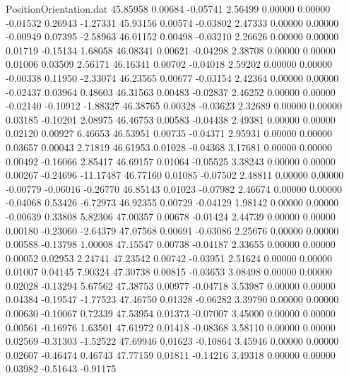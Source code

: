 \begin{filecontents}{PositionOrientation.dat}
  45.85958    0.00684   -0.05741     2.56499    0.00000    0.00000   -0.01532    0.26943   -1.27331
  45.93156    0.00574   -0.03802     2.47333    0.00000    0.00000   -0.00949    0.07395   -2.58963
  46.01152    0.00498   -0.03210     2.26626    0.00000    0.00000    0.01719   -0.15134    1.68058
  46.08341    0.00621   -0.04298     2.38708    0.00000    0.00000    0.01006    0.03509    2.56171
  46.16341    0.00702   -0.04018     2.59202    0.00000    0.00000   -0.00338    0.11950   -2.33074
  46.23565    0.00677   -0.03154     2.42364    0.00000    0.00000   -0.02437    0.03964    0.48603
  46.31563    0.00483   -0.02837     2.46252    0.00000    0.00000   -0.02140   -0.10912   -1.88327
  46.38765    0.00328   -0.03623     2.32689    0.00000    0.00000    0.03185   -0.10201    2.08975
  46.46753    0.00583   -0.04438     2.49381    0.00000    0.00000    0.02120    0.00927    6.46653
  46.53951    0.00735   -0.04371     2.95931    0.00000    0.00000    0.03657    0.00043    2.71819
  46.61953    0.01028   -0.04368     3.17681    0.00000    0.00000    0.00492   -0.16066    2.85417
  46.69157    0.01064   -0.05525     3.38243    0.00000    0.00000    0.00267   -0.24696  -11.17487
  46.77160    0.01085   -0.07502     2.48811    0.00000    0.00000   -0.00779   -0.06016   -0.26770
  46.85143    0.01023   -0.07982     2.46674    0.00000    0.00000   -0.04068    0.53426   -6.72973
  46.92355    0.00729   -0.04129     1.98142    0.00000    0.00000   -0.00639    0.33808    5.82306
  47.00357    0.00678   -0.01424     2.44739    0.00000    0.00000    0.00180   -0.23060   -2.64379
  47.07568    0.00691   -0.03086     2.25676    0.00000    0.00000    0.00588   -0.13798    1.00008
  47.15547    0.00738   -0.04187     2.33655    0.00000    0.00000    0.00052    0.02953    2.24741
  47.23542    0.00742   -0.03951     2.51624    0.00000    0.00000    0.01007    0.04145    7.90324
  47.30738    0.00815   -0.03653     3.08498    0.00000    0.00000    0.02028   -0.13294    5.67562
  47.38753    0.00977   -0.04718     3.53987    0.00000    0.00000    0.04384   -0.19547   -1.77523
  47.46750    0.01328   -0.06282     3.39790    0.00000    0.00000    0.00630   -0.10067    0.72339
  47.53954    0.01373   -0.07007     3.45000    0.00000    0.00000    0.00561   -0.16976    1.63501
  47.61972    0.01418   -0.08368     3.58110    0.00000    0.00000    0.02569   -0.31303   -1.52522
  47.69946    0.01623   -0.10864     3.45946    0.00000    0.00000    0.02607   -0.46474    0.46743
  47.77159    0.01811   -0.14216     3.49318    0.00000    0.00000    0.03982   -0.51643   -0.91175

\end{filecontents}
